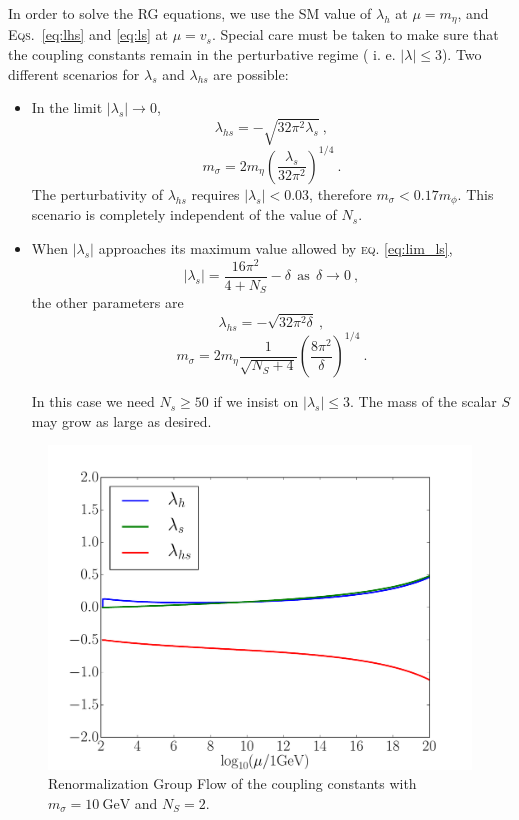 \documentclass[aps,prd,preprintnumbers,nofootinbibn,twocolumn]{revtex4}
\begin{document}
In order to solve the RG equations, we use the SM value of $\lambda_h$ at $\mu = m_\eta$, and \textsc{Eqs.}\ \eqref{eq:lhs} and \eqref{eq:ls} at $\mu=v_s$. Special care must be taken to make sure that the coupling constants remain in the perturbative regime ( i. e. $|\lambda| \leq 3$). Two different scenarios for $\lambda_s$ and $\lambda_{hs}$ are possible:
\begin{itemize}
\item In the limit $|\lambda_s|\to 0$,
\begin{equation}
\lambda_{hs} = -\sqrt{32\pi^2 \lambda_s}\ ,
\end{equation}
\begin{equation}
m_\sigma = 2 m_\eta \left(\frac{\lambda_s}{32\pi^2}\right)^{1/4}\ .
\end{equation}
The perturbativity of $\lambda_{hs}$ requires $|\lambda_s| < 0.03$, therefore $m_\sigma < 0.17 m_\phi$. This scenario is completely independent of the value of $N_s$.

\item When $|\lambda_s|$ approaches its maximum value allowed by \textsc{eq.} \eqref{eq:lim_ls},
\begin{equation}
|\lambda_s| = \frac{16\pi^2}{4+N_S} - \delta \ \ \mathrm{as}\ \ \delta\to 0\ ,
\end{equation}
the other parameters are
\begin{equation}
\lambda_{hs} = -\sqrt{32\pi^2 \delta}\ ,
\end{equation}
\begin{equation}
m_\sigma = 2 m_\eta \frac{1}{\sqrt{N_S + 4 }}\left(\frac{8\pi^2}{\delta}\right)^{1/4}\ .
\end{equation}

In this case we need $N_s \geq 50$ if we insist on $|\lambda_s| \leq 3$. The mass of the scalar $S$ may grow as large as desired.
\end{itemize}

\begin{figure}[t]
\centering
\includegraphics[width=\columnwidth]{scenario2}
\caption{Renormalization Group Flow of the coupling constants with $m_\sigma = \SI{10}{\giga\electronvolt}$ and $N_S=2$.}\label{fig:sce2}
\end{figure}
\end{document}
